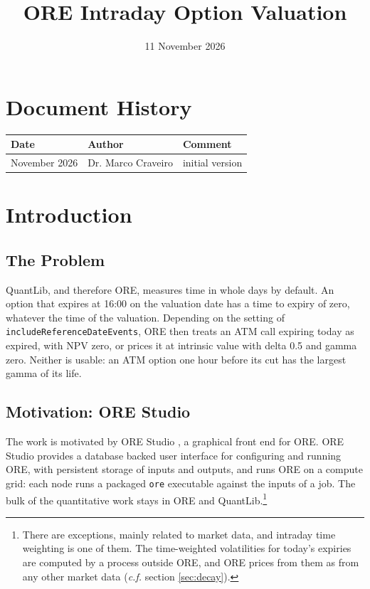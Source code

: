 \documentclass[12pt, a4paper]{article}
\begin{document}
\title{ORE Intraday Option Valuation}
\date{11 November 2026}
\maketitle

\newpage

\section*{Document History}

\begin{center}
\begin{supertabular}{|l|l|p{8cm}|}
\hline
Date & Author & Comment \\
\hline
November 2026 & Dr. Marco Craveiro & initial version\\
\hline
\end{supertabular}
\end{center}

\newpage

\tableofcontents

\newpage

\section{Introduction}

\subsection{The Problem}\label{sec:problem}

QuantLib, and therefore ORE, measures time in whole days by default. An option that expires at 16:00 on the valuation
date has a time to expiry of zero, whatever the time of the valuation. Depending on the setting of
\texttt{includeReferenceDateEvents}, ORE then treats an ATM call expiring today as expired, with NPV zero, or prices it
at intrinsic value with delta 0.5 and gamma zero. Neither is usable: an ATM option one hour before its cut has the
largest gamma of its life.

\subsection{Motivation: ORE Studio}\label{sec:orestudio}

The work is motivated by ORE Studio \cite{orestudio}, a graphical front end for ORE. ORE Studio provides a database
backed user interface for configuring and running ORE, with persistent storage of inputs and outputs, and runs ORE on a
compute grid: each node runs a packaged \texttt{ore} executable against the inputs of a job. The bulk of the
quantitative work stays in ORE and QuantLib.\footnote{There are exceptions, mainly related to market data, and intraday time weighting is one of them. The time-weighted volatilities for today's expiries are computed by a process outside ORE, and ORE prices from them as from any other market data (\textit{c.f.} section \ref{sec:decay}).}
\end{document}

